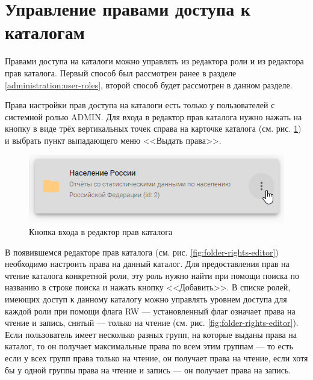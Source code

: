 \documentclass[../user-manual.tex]{subfiles}
\begin{document}
	\section{Управление правами доступа к каталогам}\label{administration:folders-rights-settings}
	
	Правами доступа на каталоги можно управлять из редактора роли и из редактора прав каталога. Первый способ был рассмотрен ранее в разделе \ref{administration:user-roles}, второй способ будет рассмотрен в данном разделе.
	
	Права настройки прав доступа на каталоги есть только у пользователей с системной ролью ADMIN. Для входа в редактор прав каталога нужно нажать на кнопку в виде трёх вертикальных точек справа на карточке каталога (см. рис. \ref{fig:folder-rights-buttons}) и выбрать пункт выпадающего меню <<Выдать права>>.
	
	\begin{figure}[h]
		\centering
		\includegraphics[width=\graphicswidth]{img/06-folder-rights-button.png}
		\caption{Кнопка входа в редактор прав каталога}
		\label{fig:folder-rights-buttons}
	\end{figure}

	В появившемся редакторе прав каталога (см. рис. \ref{fig:folder-rights-editor}) необходимо настроить права на данный каталог. Для предоставления прав на чтение каталога конкретной роли, эту роль нужно найти при помощи поиска по названию в строке поиска и нажать кнопку <<Добавить>>. В списке ролей, имеющих доступ к данному каталогу можно управлять уровнем доступа для каждой роли при помощи флага RW --- установленный флаг означает права на чтение и запись, снятый --- только на чтение (см. рис. \ref{fig:folder-rights-editor}). Если пользователь имеет несколько разных групп, на которые выданы права на каталог, то он получает максимальные права по всем этим группам --- то есть если у всех групп права только на чтение, он получает права на чтение, если хотя бы у одной группы права на чтение и запись --- он получает права на запись.
	
\end{document}
